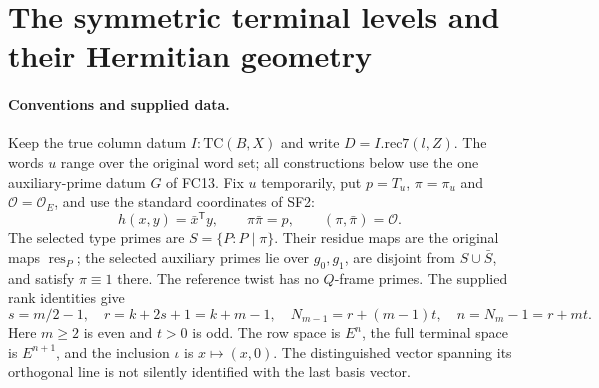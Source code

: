 \section{The symmetric terminal levels and their Hermitian geometry}
\label{sec:terminal-geometry}


\paragraph{Conventions and supplied data.}
Keep the true column datum $I:\mathrm{TC}(B,X)$ and write
$D=I.\mathrm{rec7}(l,Z)$. The words $u$ range over the original word
set; all constructions below use the one auxiliary-prime datum $G$ of
FC13. Fix $u$ temporarily, put $p=T_u$, $\pi=\pi_u$ and
$\mathcal O=\mathcal O_E$, and use the standard coordinates of SF2:
\[
 h(x,y)=\bar x^{\mathsf T}y,\qquad
 \pi\bar\pi=p,\qquad(\pi,\bar\pi)=\mathcal O.
 \tag{TG.1}
\]
The selected type primes are $S=\{P:P\mid\pi\}$. Their residue
maps are the original maps $\operatorname{res}_P$; the selected
auxiliary primes lie over $g_0,g_1$, are disjoint from $S\cup\bar S$,
and satisfy $\pi\equiv1$ there. The reference twist has no $Q$-frame
primes. The supplied rank identities give
\[
 s=m/2-1,\quad r=k+2s+1=k+m-1,\quad
 N_{m-1}=r+(m-1)t,\quad n=N_m-1=r+mt.
 \tag{TG.2}
\]
Here $m\ge2$ is even and $t>0$ is odd. The row space is $E^n$,
the full terminal space is $E^{n+1}$, and the inclusion $\iota$ is
$x\mapsto(x,0)$. The distinguished vector spanning its orthogonal
line is not silently identified with the last basis vector.

